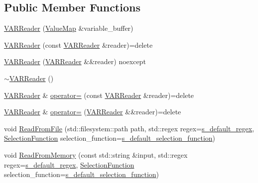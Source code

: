 \subsection*{Public Member Functions}
\begin{DoxyCompactItemize}
\item 
\mbox{\hyperlink{classmage_1_1loader_1_1_v_a_r_reader_a00b5cd2b84315925bd57920145893b7b}{V\+A\+R\+Reader}} (\mbox{\hyperlink{namespacemage_a3a4b59e486babe3ec78455f9ee0d4beb}{Value\+Map}} \&variable\+\_\+buffer)
\item 
\mbox{\hyperlink{classmage_1_1loader_1_1_v_a_r_reader_ab4ab4d94c90a2797ae40e54e0dd7c127}{V\+A\+R\+Reader}} (const \mbox{\hyperlink{classmage_1_1loader_1_1_v_a_r_reader}{V\+A\+R\+Reader}} \&reader)=delete
\item 
\mbox{\hyperlink{classmage_1_1loader_1_1_v_a_r_reader_aeefac440730fc89b16afa19695c956d5}{V\+A\+R\+Reader}} (\mbox{\hyperlink{classmage_1_1loader_1_1_v_a_r_reader}{V\+A\+R\+Reader}} \&\&reader) noexcept
\item 
\mbox{\hyperlink{classmage_1_1loader_1_1_v_a_r_reader_acd3bbd51ccc774d2f74a4520b6143990}{$\sim$\+V\+A\+R\+Reader}} ()
\item 
\mbox{\hyperlink{classmage_1_1loader_1_1_v_a_r_reader}{V\+A\+R\+Reader}} \& \mbox{\hyperlink{classmage_1_1loader_1_1_v_a_r_reader_a78d39071ad5103c848782ff82be397bb}{operator=}} (const \mbox{\hyperlink{classmage_1_1loader_1_1_v_a_r_reader}{V\+A\+R\+Reader}} \&reader)=delete
\item 
\mbox{\hyperlink{classmage_1_1loader_1_1_v_a_r_reader}{V\+A\+R\+Reader}} \& \mbox{\hyperlink{classmage_1_1loader_1_1_v_a_r_reader_a0da01229f594cb701b3e20d53be9d16e}{operator=}} (\mbox{\hyperlink{classmage_1_1loader_1_1_v_a_r_reader}{V\+A\+R\+Reader}} \&\&reader)=delete
\item 
void \mbox{\hyperlink{classmage_1_1loader_1_1_v_a_r_reader_aba8857b3d0f49250e312bd737d7d0e9c}{Read\+From\+File}} (std\+::filesystem\+::path path, std\+::regex regex=\mbox{\hyperlink{classmage_1_1_line_reader_a6713da665d123ab39293c0c5a4e8e1de}{s\+\_\+default\+\_\+regex}}, \mbox{\hyperlink{classmage_1_1_line_reader_a17bbae61a3ce30bdb251d6c76e1a4522}{Selection\+Function}} selection\+\_\+function=\mbox{\hyperlink{classmage_1_1_line_reader_a93da10f6f69b44accfec8074712f35de}{s\+\_\+default\+\_\+selection\+\_\+function}})
\item 
void \mbox{\hyperlink{classmage_1_1loader_1_1_v_a_r_reader_a6411d017fe1c7f30a544e2f0176f14a2}{Read\+From\+Memory}} (const std\+::string \&input, std\+::regex regex=\mbox{\hyperlink{classmage_1_1_line_reader_a6713da665d123ab39293c0c5a4e8e1de}{s\+\_\+default\+\_\+regex}}, \mbox{\hyperlink{classmage_1_1_line_reader_a17bbae61a3ce30bdb251d6c76e1a4522}{Selection\+Function}} selection\+\_\+function=\mbox{\hyperlink{classmage_1_1_line_reader_a93da10f6f69b44accfec8074712f35de}{s\+\_\+default\+\_\+selection\+\_\+function}})
\end{DoxyCompactItemize}
